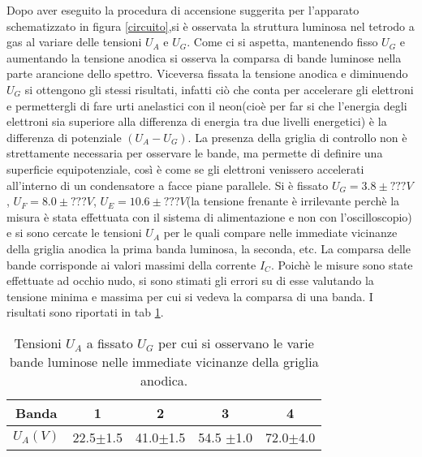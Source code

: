 \documentclass[a4paper,10pt]{article}
\begin{document}
Dopo aver eseguito la procedura di accensione suggerita per l'apparato schematizzato in figura \ref{circuito},si è osservata la struttura luminosa nel tetrodo a gas al variare delle tensioni $U_{A}$ e $U_{G}$. Come ci si aspetta, mantenendo fisso $U_{G}$ e aumentando la tensione anodica si osserva la comparsa di bande luminose nella parte arancione dello spettro. Viceversa fissata la tensione anodica e diminuendo $U_{G}$ si ottengono gli stessi risultati, infatti ciò che conta per accelerare gli elettroni e permettergli di fare urti anelastici con il neon(cioè per far si che l'energia degli elettroni sia superiore alla differenza di energia tra due livelli energetici) è la differenza di potenziale $(U_{A}-U_{G})$. La presenza della griglia di controllo non è strettamente necessaria per osservare le bande, ma permette di definire una superficie equipotenziale, così è come se gli elettroni venissero accelerati all'interno di un condensatore a facce piane parallele. \newline
Si è fissato $U_{G} = 3.8 \pm ??? V$, $U_{F}=8.0 \pm ??? V$, $U_{E} = 10.6 \pm ??? V$(la tensione frenante è irrilevante perchè la misura è stata effettuata con il sistema di alimentazione e non con l'oscilloscopio) e si sono cercate le tensioni $U_{A}$ per le quali compare nelle immediate vicinanze della griglia anodica la prima banda luminosa, la seconda, etc. La comparsa delle bande corrisponde ai valori massimi della corrente $I_{C}$. Poichè le misure sono state effettuate ad occhio nudo, si sono stimati gli errori su di esse valutando la tensione minima e massima per cui si vedeva la comparsa di una banda. I risultati sono riportati in tab \ref{massimi}.

\begin{table}[h!]
\centering
\begin{tabular}{c|c|c|c|c}
\hline
Banda &1&2&3&4\\
\hline 
$U_{A} (V)$ & 22.5$\pm$1.5 & 41.0$\pm$1.5 & 54.5 $\pm$1.0 & 72.0$\pm$4.0  \\ 
\hline
\end{tabular}
\label{massimi}
\caption{Tensioni $U_{A}$ a fissato $U_{G}$ per cui si osservano le varie bande luminose nelle immediate vicinanze della griglia anodica.} 
\end{table}


\end{document}
